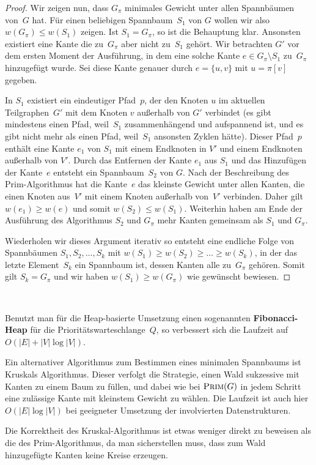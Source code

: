 \begin{proof}
\condclearpage

Wir zeigen nun, dass $G_\pi$ minimales Gewicht unter allen Spannbäumen von~$G$ hat.
Für einen beliebigen Spannbaum~$S_1$ von $G$ wollen wir also $w(G_\pi) \le w(S_1)$ zeigen.
Ist $S_1=G_\pi$, so ist die Behauptung klar. 
Ansonsten existiert eine Kante die zu~$G_\pi$ aber nicht zu~$S_1$ gehört.
Wir betrachten $G'$ vor dem ersten Moment der Ausführung, in dem eine solche Kante $e \in G_\pi \setminus S_1$ zu~$G_\pi$ hinzugefügt wurde.
Sei diese Kante genauer durch $e = \{u,v\}$ mit $u = \pi[v]$ gegeben.

In $S_1$ existiert ein eindeutiger Pfad~$p$, der den Knoten $u$ im aktuellen Teilgraphen~$G'$ mit dem Knoten $v$ außerhalb von $G'$ verbindet (es gibt mindestens einen Pfad, weil~$S_1$ zusammenhängend und aufspannend ist, und es gibt nicht mehr als einen Pfad, weil~$S_1$ ansonsten Zyklen hätte).
Dieser Pfad~$p$ enthält eine Kante $e_1$ von $S_1$ mit einem Endknoten in $V'$ und einem Endknoten außerhalb von $V'$.
Durch das Entfernen der Kante $e_1$ aus $S_1$ und das Hinzufügen der Kante~$e$ entsteht ein Spannbaum~$S_2$ von $G$. 
Nach der Beschreibung des Prim-Algorithmus hat die Kante~$e$ das kleinste Gewicht unter allen Kanten, die einen Knoten aus~$V'$ mit einem Knoten außerhalb von~$V'$ verbinden.
Daher gilt $w(e_1) \ge w(e)$ und somit $w(S_2) \le w(S_1)$.
Weiterhin haben am Ende der Ausführung des Algorithmus $S_2$ und $G_\pi$ mehr Kanten gemeinsam als $S_1$ und $G_\pi$.

Wiederholen wir dieses Argument iterativ so entsteht eine endliche Folge von Spannbäumen $S_1, S_2,\ldots, S_k$ mit $w(S_1) \ge w(S_2) \ge \ldots \geq w(S_k)$, in der das letzte Element~$S_k$ ein Spannbaum ist, dessen Kanten alle zu~$G_\pi$ gehören.
Somit gilt $S_k=G_\pi$ und wir haben $w(S_1) \ge w(G_\pi)$ wie gewünscht bewiesen.
\end{proof}


\begin{bem}\
\begin{enuma}
 \item Benutzt man für die Heap-basierte Umsetzung einen sogenannten \textbf{Fibonacci-Heap} für die Prioritätswarteschlange~$Q$, so verbessert sich die Laufzeit auf $O(|E|+|V|\log|V|)$.

 \item Ein alternativer Algorithmus zum Bestimmen eines minimalen Spannbaums ist Kruskals Algorithmus.
Dieser verfolgt die Strategie, einen Wald sukzessive mit Kanten zu einem Baum zu füllen, und dabei wie bei $\mathop{\text{\textsc{Prim}}}(G)$ in jedem Schritt eine zulässige Kante mit kleinstem Gewicht zu wählen.
Die Laufzeit ist auch hier $O(|E|\log|V|)$ bei geeigneter Umsetzung der involvierten Datenstrukturen.

Die Korrektheit des Kruskal-Algorithmus ist etwas weniger direkt zu beweisen als die des Prim-Algorithmus, da man sicherstellen muss, dass zum Wald hinzugefügte Kanten keine Kreise erzeugen.

\end{enuma}
\end{bem}

